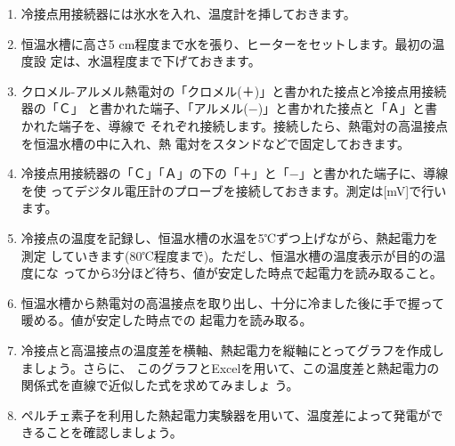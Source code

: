 \bigskip


\begin{enumerate}

\item 冷接点用接続器には氷水を入れ、温度計を挿しておきます。

\item 恒温水槽に高さ5 cm程度まで水を張り、ヒーターをセットします。最初の温度設
定は、水温程度まで下げておきます。

\item クロメル-アルメル熱電対の「クロメル(＋)」と書かれた接点と冷接点用接続器の「Ｃ」 
と書かれた端子、「アルメル(−)」と書かれた接点と「Ａ」と書かれた端子を、導線で 
それぞれ接続します。接続したら、熱電対の高温接点を恒温水槽の中に入れ、熱 
電対をスタンドなどで固定しておきます。

\item 冷接点用接続器の「Ｃ」「Ａ」の下の「＋」と「−」と書かれた端子に、導線を使 
ってデジタル電圧計のプローブを接続しておきます。測定は[mV]で行います。

\item 冷接点の温度を記録し、恒温水槽の水温を5℃ずつ上げながら、熱起電力を測定 
していきます(80℃程度まで)。ただし、恒温水槽の温度表示が目的の温度にな 
ってから3分ほど待ち、値が安定した時点で起電力を読み取ること。

\item 恒温水槽から熱電対の高温接点を取り出し、十分に冷ました後に手で握って暖める。値が安定した時点での
起電力を読み取る。

\item 冷接点と高温接点の温度差を横軸、熱起電力を縦軸にとってグラフを作成しましょう。さらに、
このグラフとExcelを用いて、この温度差と熱起電力の関係式を直線で近似した式を求めてみましょ
う。

\item ペルチェ素子を利用した熱起電力実験器を用いて、温度差によって発電ができることを確認しましょう。

\end{enumerate}



